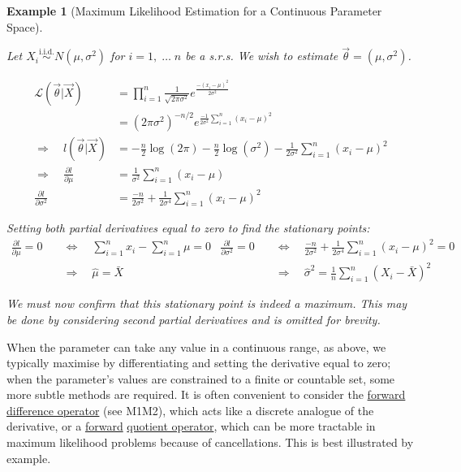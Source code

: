 \documentclass[12pt,a4paper]{article}
\newtheorem{ex}[thm]{Example}
\begin{document}
\begin{ex}[Maximum Likelihood Estimation for a Continuous Parameter Space]$\;$\par\vspace{1cm}

Let $X_i \overset{\text{i.i.d.}}{\sim} N(\mu, \sigma^2)$ for $i = 1,\;\hdots\; n$ be a s.r.s. We wish to estimate $\vec{\theta} = (\mu,\sigma^2)$.

\begin{align*}
\mathcal{L}(\vec{\theta}|\vec{X}) &= \prod_{i=1}^n \frac{1}{\sqrt{2 \pi \sigma^2}} e^{\frac{-(x_i - \mu)^2}{2\sigma^2}}\\
&= (2\pi\sigma^2)^{-n/2} e^{\frac{-1}{2\sigma^2} \sum\limits_{i=1}^n (x_i - \mu)^2}\\
\Rightarrow \quad l(\vec{\theta}|\vec{X}) &= -\frac{n}{2}\log(2\pi) - \frac{n}{2}\log(\sigma^2) - \frac{1}{2\sigma^2} \sum_{i=1}^n (x_i - \mu)^2\\
\Rightarrow\quad \frac{\partial l}{\partial \mu} &= \frac{1}{\sigma^2}\sum_{i=1}^n(x_i - \mu)\\
\frac{\partial l}{\partial \sigma^2} &= \frac{-n}{2\sigma^2} + \frac{1}{2\sigma^4}\sum_{i=1}^n(x_i - \mu)^2
\end{align*}

\noindent Setting both partial derivatives equal to zero to find the stationary points:
\begin{align*}
\frac{\partial l}{\partial \mu} = 0 \quad&\Leftrightarrow\quad \sum_{i=1}^n x_i - \sum_{i=1}^n \mu = 0 & \frac{\partial l}{\partial \sigma^2} = 0 \quad&\Leftrightarrow\quad \frac{-n}{2\sigma^2} + \frac{1}{2\sigma^4}\sum_{i=1}^n (x_i - \mu)^2 = 0\\
&\Rightarrow\quad \hat{\mu} = \bar{X} & &\Rightarrow\quad \hat{\sigma}^2 = \frac{1}{n} \sum_{i=1}^n (X_i - \bar{X})^2
\end{align*}

We must now confirm that this stationary point is indeed a maximum. This may be done by considering second partial derivatives and is omitted for brevity.

\end{ex}

When the parameter can take any value in a continuous range, as above, we typically maximise by differentiating and setting the derivative equal to zero; when the parameter's values are constrained to a finite or countable set, some more subtle methods are required. It is often convenient to consider the \underline{forward difference operator} (see M1M2), which acts like a discrete analogue of the derivative, or a \underline{forward} \underline{quotient operator}, which can be more tractable in maximum likelihood problems because of cancellations. This is best illustrated by example.
\end{document}
